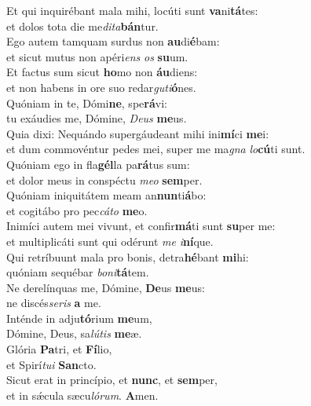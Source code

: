 \oddverse Et qui inquirébant mala mihi, locúti sunt \textbf{va}ni\textbf{tá}tes:~\*\\
\oddverse et dolos tota die me\textit{di}\textit{ta}\textbf{bán}tur.\\
\evenverse Ego autem tamquam surdus non \textbf{au}di\textbf{é}bam:~\*\\
\evenverse et sicut mutus non apéri\textit{ens} \textit{os} \textbf{su}um.\\
\oddverse Et factus sum sicut \textbf{ho}mo non \textbf{áu}diens:~\*\\
\oddverse et non habens in ore suo redar\textit{gu}\textit{ti}\textbf{ó}nes.\\
\evenverse Quóniam in te, Dómi\textbf{ne}, spe\textbf{rá}vi:~\*\\
\evenverse tu exáudies me, Dómine, \textit{De}\textit{us} \textbf{me}us.\\
\oddverse Quia dixi: Nequándo supergáudeant mihi ini\textbf{mí}ci \textbf{me}i:~\*\\
\oddverse et dum commovéntur pedes mei, super me ma\textit{gna} \textit{lo}\textbf{cú}ti sunt.\\
\evenverse Quóniam ego in fla\textbf{gél}la pa\textbf{rá}tus sum:~\*\\
\evenverse et dolor meus in conspéctu \textit{me}\textit{o} \textbf{sem}per.\\
\oddverse Quóniam iniquitátem meam an\textbf{nun}ti\textbf{á}bo:~\*\\
\oddverse et cogitábo pro pec\textit{cá}\textit{to} \textbf{me}o.\\
\evenverse Inimíci autem mei vivunt, et confir\textbf{má}ti sunt \textbf{su}per me:~\*\\
\evenverse et multiplicáti sunt qui odérunt \textit{me} \textit{i}\textbf{ní}que.\\
\oddverse Qui retríbuunt mala pro bonis, detra\textbf{hé}bant \textbf{mi}hi:~\*\\
\oddverse quóniam sequébar \textit{bo}\textit{ni}\textbf{tá}tem.\\
\evenverse Ne derelínquas me, Dómine, \textbf{De}us \textbf{me}us:~\*\\
\evenverse ne discés\textit{se}\textit{ris} \textbf{a} me.\\
\oddverse Inténde in adju\textbf{tó}rium \textbf{me}um,~\*\\
\oddverse Dómine, Deus, sa\textit{lú}\textit{tis} \textbf{me}æ.\\
\evenverse Glória \textbf{Pa}tri, et \textbf{Fí}lio,~\*\\
\evenverse et Spirí\textit{tu}\textit{i} \textbf{San}cto.\\
\oddverse Sicut erat in princípio, et \textbf{nunc}, et \textbf{sem}per,~\*\\
\oddverse et in sǽcula sæcu\textit{ló}\textit{rum}. \textbf{A}men.\\
